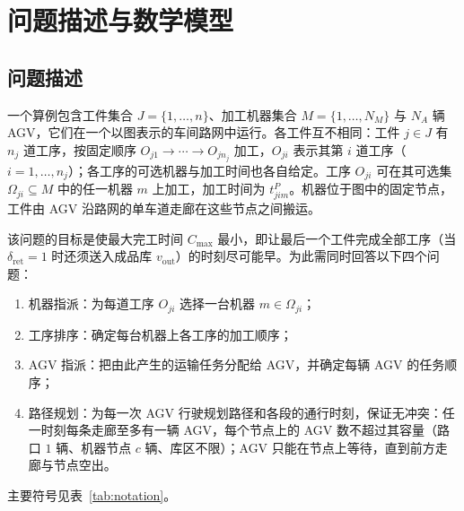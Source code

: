 \documentclass[manuscript,screen,review]{acmart}
\begin{document}
\section{问题描述与数学模型}
\label{sec:Chapter_III}

\subsection{问题描述}

一个算例包含工件集合 $J=\{1,\dots,n\}$、加工机器集合 $M=\{1,\dots,N_M\}$ 与 $N_A$ 辆 AGV，它们在一个以图表示的车间路网中运行。各工件互不相同：工件 $j\in J$ 有 $n_j$ 道工序，按固定顺序 $O_{j1}\to\cdots\to O_{jn_j}$ 加工，$O_{ji}$ 表示其第 $i$ 道工序（$i=1,\dots,n_j$）；各工序的可选机器与加工时间也各自给定。工序 $O_{ji}$ 可在其可选集 $\Omega_{ji}\subseteq M$ 中的任一机器 $m$ 上加工，加工时间为 $t^P_{jim}$。机器位于图中的固定节点，工件由 AGV 沿路网的单车道走廊在这些节点之间搬运。

该问题的目标是使最大完工时间 $C_{\max}$ 最小，即让最后一个工件完成全部工序（当 $\delta_{\mathrm{ret}}=1$ 时还须送入成品库 $v_{\mathrm{out}}$）的时刻尽可能早。为此需同时回答以下四个问题：

\begin{enumerate}[label=(\roman*),leftmargin=*,topsep=2pt,itemsep=1pt]
\item 机器指派：为每道工序 $O_{ji}$ 选择一台机器 $m\in\Omega_{ji}$；
\item 工序排序：确定每台机器上各工序的加工顺序；
\item AGV 指派：把由此产生的运输任务分配给 AGV，并确定每辆 AGV 的任务顺序；
\item 路径规划：为每一次 AGV 行驶规划路径和各段的通行时刻，保证无冲突：任一时刻每条走廊至多有一辆 AGV，每个节点上的 AGV 数不超过其容量（路口 $1$ 辆、机器节点 $c$ 辆、库区不限）；AGV 只能在节点上等待，直到前方走廊与节点空出。
\end{enumerate}
主要符号见表~\ref{tab:notation}。
\end{document}
